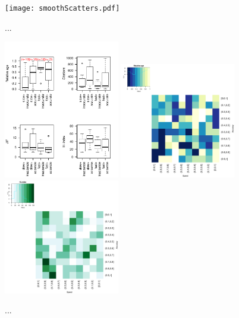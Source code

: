 \documentclass[fleqn,10pt]{SelfArx} %
\begin{document}
\begin{figure}[H]
\centering
\texttt{[image: smoothScatters.pdf]}
\caption{...}
\label{fig:S3}
\end{figure}



\begin{figure}[H]
\centering
\includegraphics[width=0.45\textwidth]{relAge-speedAcc.pdf}
\includegraphics[width=0.45\textwidth]{relAge-SpeedVsAccuracy-heatmap.pdf}\\
\includegraphics[width=0.45\textwidth]{hindex-SpeedVsAccuracy-heatmap.pdf}
\caption{...}
\label{fig:S4}
\end{figure}
\end{document}
